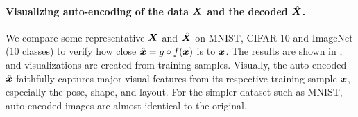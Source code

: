 \documentclass[../../book-main.tex]{subfiles}
\begin{document}
\paragraph{Visualizing auto-encoding of the data $\bm{X}$ and the decoded $\hat {\bm{X}}$.} We compare some representative $\bm{X}$ and $\hat{\bm{X}}$ on MNIST, CIFAR-10 and ImageNet (10 classes) to verify how close $\hat {\bm{x}} = g\circ f(\bm{x})$ is to $\bm{x}$. The results are shown in , and visualizations are created from training samples. Visually, the auto-encoded $\hat {\bm{x}}$ faithfully captures major visual features from its respective training sample $\bm{x}$, especially the pose, shape, and layout. For the simpler dataset such as MNIST, auto-encoded images are almost identical to the original. %

\end{document}
